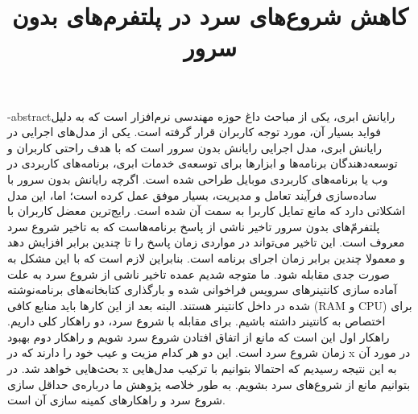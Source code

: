 \documentclass[oneside,openany,mscS]{SBU-Thesis}
\begin{document}
	\title{کاهش شروع‌های سرد در پلتفرم‌های بدون سرور}
	
	\subject{مهندسی کامپیوتر}
	
	
	


	
	

	\fa-abstract{رایانش ابری، یکی از مباحث داغ حوزه مهندسی نرم‌افزار است که به دلیل فواید بسیار آن، مورد توجه کاربران قرار گرفته است. یکی از مدل‌های اجرایی در رایانش ابری، مدل اجرایی رایانش بدون سرور است که با هدف راحتی کاربران و توسعه‌دهندگان برنامه‌ها و ابزارها برای توسعه‌ی خدمات ابری، برنامه‌های کاربردی در وب یا برنامه‌های کاربردی موبایل طراحی شده است. اگرچه رایانش بدون سرور با ساده‌سازی فرآیند تعامل و مدیریت،‌ بسیار موفق عمل کرده است؛ اما، این مدل اشکلاتی دارد که مانع تمایل کاربرا به سمت آن شده است. رایج‌ترین معضل کاربران با پلتفرم‌ّهای بدون سرور تاخیر ناشی از پاسخ برنامه‌هاست که به تاخیر شروع سرد معروف است. این تاخیر می‌تواند در مواردی زمان پاسخ را تا چندین برابر افزایش دهد و معمولا چندین برابر زمان اجرای برنامه است. بنابراین لازم است که با این مشکل به صورت جدی مقابله شود. ما متوجه‌ شدیم عمده تاخیر ناشی از شروع سرد به علت آماده سازی کانتینر‌های سرویس فراخوانی شده و بارگذاری کتابخانه‌های برنامه‌نوشته شده در داخل کانتینر هستند. البته بعد از این کارها باید منابع کافی (RAM و CPU) برای اختصاص به کانتینر داشته باشیم. برای مقابله با شروع سرد، دو راهکار کلی داریم. راهکار اول این است که مانع از اتفاق افتادن شروع سرد شویم و راهکار دوم بهبود زمان شروع سرد است. این دو هر کدام مزیت و عیب خود را دارند که در x در مورد آن بحث‌هایی خواهد شد. در x به این نتیجه رسیدیم که احتمالا بتوانیم با ترکیب مدل‌هایی بتوانیم مانع از شروع‌های سرد بشویم.  به طور خلاصه پژوهش ما درباره‌ی حداقل سازی شروع سرد و راهکار‌های کمینه سازی آن است. }

\firstPage
\abstractPage %


\tableofcontents %
\listoffigures \newpage %
\listoftables \newpage %







	
\newpage

\end{document}

